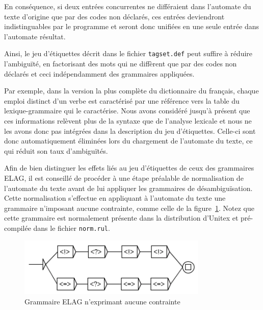\bigskip
\noindent En conséquence, si deux entrées concurrentes ne différaient dans l’automate du texte
d’origine que par des codes non déclarés, ces entrées deviendront indistinguables par le programme
et seront donc unifiées en une seule entrée dans l’automate résultat.


\bigskip
\noindent Ainsi, le jeu d’étiquettes décrit dans le fichier \verb$tagset.def$                                                                                peut suffire à
réduire l’ambiguïté, en factorisant des mots qui ne diffèrent que par des codes non déclarés
et ceci indépendamment des grammaires appliquées.


\bigskip
\noindent Par exemple, dans la version la plus complète du dictionnaire du français, chaque emploi
distinct d’un verbe est caractérisé par une référence vers la table du lexique-grammaire qui
le caractérise. Nous avons considéré jusqu’à présent que ces informations relèvent plus de
la syntaxe que de l’analyse lexicale et nous ne les avons donc pas intégrées dans la description
du jeu d’étiquettes. Celle-ci sont donc automatiquement éliminées lors du chargement de
l’automate du texte, ce qui réduit son taux d’ambiguïtés.


\bigskip
\noindent Afin de bien distinguer les effets liés au jeu d’étiquettes de ceux des grammaires
ELAG, il est conseillé de procéder à une étape préalable de normalisation de l’automate
du texte avant de lui appliquer les grammaires de désambiguïsation. Cette normalisation
s’effectue en appliquant à l’automate du texte une grammaire n’imposant aucune contrainte,
comme celle de la figure~\ref{fig-elag-norm}. Notez que cette grammaire est normalement présente
dans la distribution d’Unitex et pré-compilée dans le fichier
\verb+norm.rul+.

\begin{figure}[!ht]
\begin{center}
\includegraphics[width=9cm]{resources/img/fig7-20.png}
\caption{Grammaire ELAG n’exprimant aucune contrainte\label{fig-elag-norm}}
\end{center}
\end{figure}

